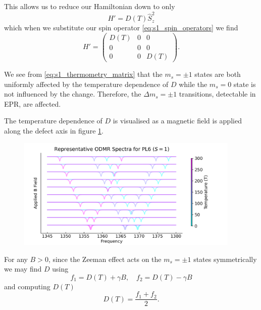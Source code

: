 This allows us to reduce our Hamiltonian down to only
\begin{equation}
	H' = D(T) \hat{S}_z^2
	\label{eq:}
\end{equation}
which when we substitute our spin operator \eqref{eq:s1_spin_operators} we find
\begin{equation}
	H' = \begin{pmatrix}
		D(T) & 0 & 0    \\
		0    & 0 & 0    \\
		0    & 0 & D(T)
	\end{pmatrix}.
	\label{eq:s1_thermometry_matrix}
\end{equation}

We see from \eqref{eq:s1_thermometry_matrix} that the $m_s = \pm 1$ states are both uniformly affected by the temperature dependence of $D$ while the $m_s =0$ state is not influenced by the change. Therefore, the $\Delta m_s = \pm1$ transitions, detectable in EPR, are affected.

The temperature dependence of $D$ is visualised as a magnetic field is applied along the defect axis in figure \ref{fig:s1-temp-dependence}.

\begin{figure}[H]
	\begin{center}
		\includegraphics[width=0.95\textwidth]{figures/ODMR-s1-temp-dependence.png}
	\end{center}
	\caption{}\label{fig:s1-temp-dependence}
\end{figure}

For any $B > 0$, since the Zeeman effect acts on the $m_s = \pm1$ states symmetrically we may find $D$ using
\begin{equation}
	f_1 = D(T) + \gamma B, \quad f_2 = D(T) - \gamma B
	\label{eq:}
\end{equation}
and computing $D(T)$
\begin{equation}
	D(T) = \frac{f_1 + f_2}{2}.
	\label{eq:average_freq_thermo}
\end{equation}

